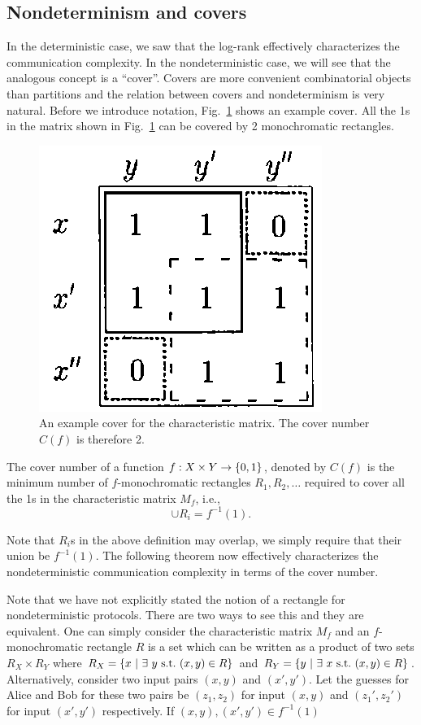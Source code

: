 \documentclass[letterpaper]{article}
\providecommand\cbrac[1]{\ensuremath \left\{#1\right\}}
\newcommand{\X}{X}
\newcommand{\Y}{Y}
\newcommand{\mf}{M_f}
\newcommand{\cf}{C(f)}
\begin{document}
\subsection{Nondeterminism and covers}

In the deterministic case, we saw that the log-rank effectively characterizes the communication complexity. In the nondeterministic case, we will see that the analogous concept is a ``cover''. Covers are more convenient combinatorial objects than partitions and the relation between covers and nondeterminism is very natural. Before we introduce notation, Fig.~\ref{fig:cover_example} shows an example cover. All the 1s in the matrix shown in Fig.~\ref{fig:cover_example} can be covered by 2 monochromatic rectangles.
\begin{figure}
\centering
\includegraphics[width=0.3 \textwidth]{cover_example}
\caption{An example cover for the characteristic matrix. The cover number $\cf$ is therefore 2.}
\label{fig:cover_example}
\end{figure}

\begin{definition}
The cover number of a function $f : \X \times \Y \to \cbrac{0,1}$, denoted by $\cf$ is the minimum number of $f$-monochromatic rectangles $R_1, R_2, \ldots$ required to cover all the 1s in the characteristic matrix $\mf$, i.e.,
$$
\cup R_i = f^{-1}(1).
$$
\end{definition}
Note that $R_i$s in the above definition may overlap, we simply require that their union be $f^{-1}(1)$. The following theorem now effectively characterizes the nondeterministic communication complexity in terms of the cover number.

Note that we have not explicitly stated the notion of a rectangle for nondeterministic protocols. There are two ways to see this and they are equivalent. One can simply consider the characteristic matrix $\mf$ and an $f$-monochromatic rectangle $R$ is a set which can be written as a product of two sets $R_X \times R_Y$ where $R_X = \cbrac{ x\ |\ \exists\ y\ \mathrm{s.t.}\ (x,y) \in R}$ and $R_Y = \cbrac{ y\ |\ \exists\ x\ \mathrm{s.t.}\ (x,y) \in R}$. Alternatively, consider two input pairs $(x,y)$ and $(x', y')$. Let the guesses for Alice and Bob for these two pairs be $(z_1, z_2)$ for input $(x,y)$ and $(z_1', z_2')$ for input $(x',y')$ respectively. If $(x,y), (x',y') \in f^{-1}(1)$
\end{document}
